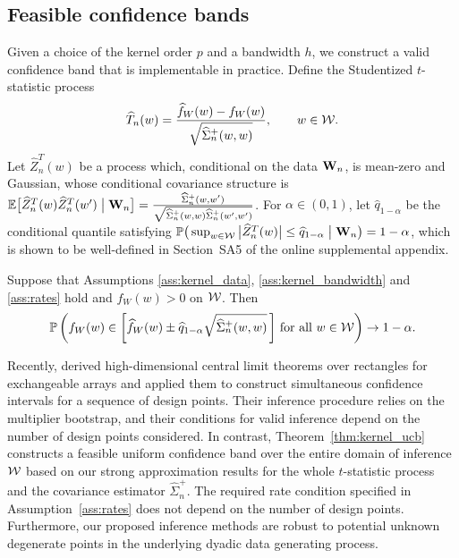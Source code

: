 \subsection{Feasible confidence bands}
\label{sec:feasible_confidence_bands}

Given a choice of the kernel order $p$
and a bandwidth $h$, we construct a valid confidence
band that is implementable in practice.
Define the Studentized $t$-statistic process
%
\[ \widehat T_n(w) = \frac{\widehat{f}_W(w) - f_W(w)}{\sqrt{\widehat
      \Sigma_n^+(w,w)}} , \qquad w\in\mathcal{W}.\]
%
Let $\widehat Z_n^T(w)$ be a process which,
conditional on the data $\mathbf{W}_n$,
is mean-zero and Gaussian, whose
conditional covariance structure is
$\mathbb{E}\big[ \widehat Z_n^T(w) \widehat Z_n^T(w') \bigm\vert \mathbf{W}_n \big]
= \frac{\widehat \Sigma_n^+(w,w')}
{\sqrt{\widehat \Sigma_n^+(w,w) \widehat \Sigma_n^+(w',w')}}$.
For $\alpha \in (0,1)$, let $\widehat q_{1-\alpha}$ be the
conditional quantile satisfying
%
$ \mathbb{P}\big(\sup_{w \in \mathcal{W}}
\big| \widehat Z_n^T(w) \big|
\leq \widehat q_{1-\alpha}
\bigm\vert \mathbf{W}_n \big)
= 1 - \alpha$,
%
which is shown to be well-defined in
Section~SA5 of
the online supplemental appendix.

\begin{theorem}
  \label{thm:kernel_ucb}

  Suppose that Assumptions \ref{ass:kernel_data}, \ref{ass:kernel_bandwidth}
  and \ref{ass:rates} hold and $f_W(w) > 0$ on $\mathcal{W}$. Then
  \begin{align*}
    \mathbb{P}\left(
      f_W(w)
      \in
      \left[
        \widehat f_W(w)
        \pm
        \widehat q_{1-\alpha}
        \sqrt{\widehat\Sigma_n^+(w,w)}
        \,\right]
      \,\textup{for all }
      w \in \mathcal{W}
    \right)
    \to 1 - \alpha.
  \end{align*}
\end{theorem}

Recently, \cite{chiang2022inference} derived high-dimensional central limit
theorems over rectangles for exchangeable arrays and applied them to construct
simultaneous confidence intervals for a sequence of design points. Their
inference procedure relies on the multiplier bootstrap,
and their conditions for valid inference
depend on the number of design points considered.
In contrast, Theorem~\ref{thm:kernel_ucb} constructs a feasible uniform
confidence band
over the entire domain of inference $\mathcal{W}$ based on our strong
approximation results for the whole $t$-statistic process
and the covariance estimator $\widehat\Sigma_n^+$.
The required rate condition specified in
Assumption~\ref{ass:rates} does not depend on the number of design points.
Furthermore, our proposed inference methods are robust to potential
unknown degenerate points in the underlying dyadic data generating process.

